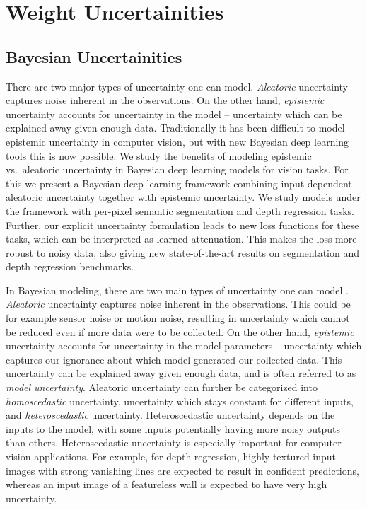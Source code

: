 \section{Weight Uncertainities}
\subsection{Bayesian Uncertainities}

There are two major types of uncertainty one can model. \textit{Aleatoric} uncertainty captures noise inherent in the observations. On the other hand, \textit{epistemic} uncertainty accounts for uncertainty in the model -- uncertainty which can be explained away given enough data. Traditionally it has been difficult to model epistemic uncertainty in computer vision, but with new Bayesian deep learning tools this is now possible.
We study the benefits of modeling epistemic vs.\ aleatoric uncertainty in Bayesian deep learning models for vision tasks. For this we present a Bayesian deep learning framework combining input-dependent aleatoric uncertainty together with epistemic uncertainty. We study models under the framework with per-pixel semantic segmentation and depth regression tasks. Further, our explicit uncertainty formulation leads to new loss functions for these tasks, which can be interpreted as learned attenuation. This makes the loss more robust to noisy data, also giving new state-of-the-art results on segmentation and depth regression benchmarks. 

In Bayesian modeling, there are two main types of uncertainty one can model \citep{der2009aleatory}. \textit{Aleatoric} uncertainty captures noise inherent in the observations.
This could be for example sensor noise or motion noise, resulting in uncertainty which cannot be reduced even if more data were to be collected.
On the other hand, \textit{epistemic} uncertainty accounts for uncertainty in the model parameters -- uncertainty which captures our ignorance about which model generated our collected data. 
This uncertainty can be explained away given enough data, and is often referred to as \textit{model uncertainty}. Aleatoric uncertainty can further be categorized into \textit{homoscedastic} uncertainty, uncertainty which stays constant for different inputs, and \textit{heteroscedastic} uncertainty. Heteroscedastic uncertainty depends on the inputs to the model, with some inputs potentially having more noisy outputs than others. 
Heteroscedastic uncertainty is especially important for computer vision applications. For example, for depth regression, highly textured input images with strong vanishing lines are expected to result in confident predictions, whereas an input image of a featureless wall is expected to have very high uncertainty.


